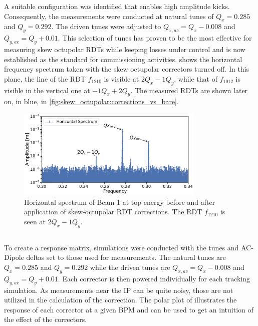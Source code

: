 A suitable configuration was identified that enables high amplitude kicks. Consequently, the
measurements were conducted at natural tunes of $Q_x = 0.285$ and $Q_y = 0.292$. The driven
tunes were adjusted to $Q_{x,ac} = Q_x -0.008$ and $Q_{y,ac} = Q_y + 0.01$. This selection of tunes
has proven to be the most effective for measuring skew octupolar RDTs while keeping losses under
control and is now established as the standard for commissioning activities.
 shows the horizontal frequency spectrum taken
with the skew octupolar correctors turned off. In this plane, the line of the RDT $f_{1210}$ is
visible at $2Q_x - 1Q_y$, while that of $f_{1012}$ is visible in the vertical one at $-1Q_x + 2Q_y$.
The measured RDTs are shown later on, in blue, in \cref{fig:skew_octupolar:corrections_vs_bare}.

\begin{figure}[!htb]
    \centering
    \includegraphics[width=0.8\textwidth]{./images/spectrum_a4_top_energy.pdf}
    \caption{Horizontal spectrum of Beam 1 at top energy before and after application of
    skew-octupolar RDT corrections. The RDT $f_{1210}$ is seen at $2Q_x - 1Q_y$.}
    \label{fig:skew_octupolar:spectrum_a4_top_energy}
\end{figure}




\subsection{}

To create a response matrix, simulations were conducted with the tunes and AC-Dipole deltas set to
those used for measurements. The natural tunes are $Q_x = 0.285$ and $Q_y = 0.292$ while the driven
tunes are $Q_{x,ac} = Q_x -0.008$ and $Q_{y,ac} = Q_y + 0.01$. Each corrector is then powered
individually for each tracking simulation. As measurements near the IP can be quite noisy, those are
not utilized in the calculation of the correction. The polar plot of
 illustrates the response of each corrector at a
given BPM and can be used to get an intuition of the effect of the correctors.

